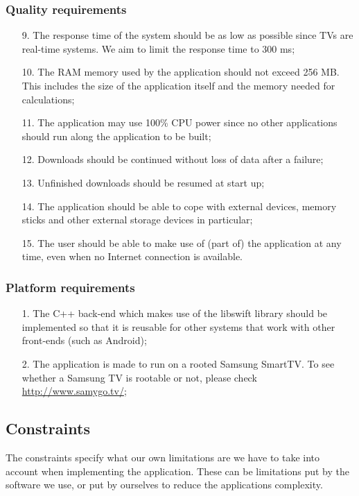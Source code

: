 \subsubsection{Quality requirements}
\begin{itemize}
\item[9.] The response time of the system should be as low as possible since TVs are real-time systems.
We aim to limit the response time to 300 ms;
\item[10.] The RAM memory used by the application should not exceed 256 MB.
This includes the size of the application itself and the memory needed for calculations;
\item[11.] The application may use 100\% CPU power since no other applications should run along the application 
to be built;
\item[12.] Downloads should be continued without loss of data after a failure;
\item[13.] Unfinished downloads should be resumed at start up;
\item[14.] The application should be able to cope with external devices,
memory sticks and other external storage devices in particular;
\item[15.] The user should be able to make use of (part of) the application at any time,
even when no Internet connection is available.
\end{itemize}

\subsubsection{Platform requirements}
\begin{itemize}
\item[1.] The C++ back-end which makes use of the libswift library should be implemented so 
that it is reusable for other systems that work with other front-ends (such as Android);
\item[2.] The application is made to run on a rooted Samsung SmartTV.
To see whether a Samsung TV is rootable or not, please check \url{http://www.samygo.tv/};
\end{itemize}

\subsection{Constraints}
The constraints specify what our own limitations are we have to take into account when implementing the application. 
These can be limitations put by the software we use,
or put by ourselves to reduce the application\textquotesingle s complexity.

